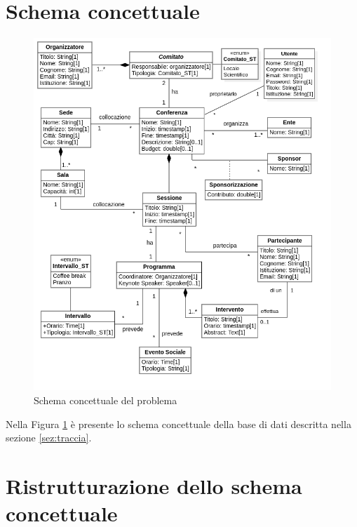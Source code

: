 \section{Schema concettuale}
\begin{figure}[h!]
\centering
\includegraphics[scale=0.6]{Immagini/Schema_Concettuale.png}
\caption{Schema concettuale del problema}\label{uml:schema_concettuale}
\end{figure}
Nella Figura \ref{uml:schema_concettuale} è presente lo schema concettuale della base di dati descritta nella sezione \ref{sez:traccia}.
\section{Ristrutturazione dello schema concettuale}

